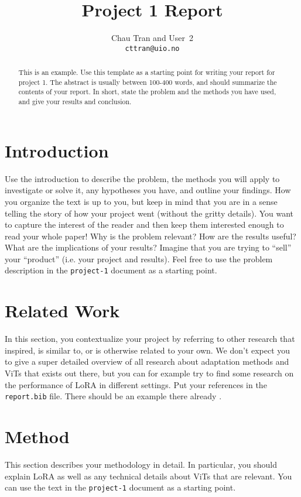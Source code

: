 \documentclass[10pt]{article}
\begin{document}
\title{Project 1 Report}
\author{Chau Tran and User~2\\\footnotesize\texttt{cttran@uio.no}}
\date{}
\maketitle

\begin{abstract}
  This is an example. Use this template as a starting point for writing your report for project 1. The abstract is usually between 100-400 words, and should summarize the contents of your report. In short, state the problem and the methods you have used, and give your results and conclusion.
\end{abstract}

\section{Introduction}
Use the introduction to describe the problem, the methods you will apply to investigate or solve it, any hypotheses you have, and outline your findings.
How you organize the text is up to you, but keep in mind that you are in a sense telling the story of how your project went (without the gritty details). You want to capture the interest of the reader and then keep them interested enough to read your whole paper!
Why is the problem relevant? How are the results useful? What are the implications of your results?
Imagine that you are trying to ``sell'' your ``product'' (i.e. your project and results).
Feel free to use the problem description in the \texttt{project-1} document as a starting point.

\section{Related Work}
In this section, you contextualize your project by referring to other research that inspired, is similar to, or is otherwise related to your own.
We don't expect you to give a super detailed overview of all research about adaptation methods and ViTs that exists out there, but you can for example try to find some research on the performance of LoRA in different settings.
Put your references in the \texttt{report.bib} file. There should be an example there already \cite{Test}.

\section{Method}
This section describes your methodology in detail. In particular, you should explain LoRA as well as any technical details about ViTs that are relevant.
You can use the text in the \texttt{project-1} document as a starting point.
\end{document}
